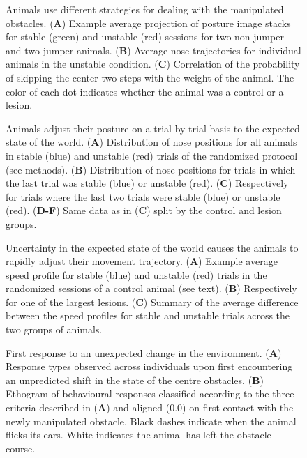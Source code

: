 \begin{figure}
\centering

\caption{Animals use different strategies for dealing with the manipulated obstacles. (\textbf{A}) Example average projection of posture image stacks for stable (green) and unstable (red) sessions for two non-jumper and two jumper animals. (\textbf{B}) Average nose trajectories for individual animals in the unstable condition. (\textbf{C}) Correlation of the probability of skipping the center two steps with the weight of the animal. The color of each dot indicates whether the animal was a control or a lesion.}
\label{fig:jumping}
\end{figure}

\begin{figure}
\centering

\caption{Animals adjust their posture on a trial-by-trial basis to the expected state of the world. (\textbf{A}) Distribution of nose positions for all animals in stable (blue) and unstable (red) trials of the randomized protocol (see methods). (\textbf{B}) Distribution of nose positions for trials in which the last trial was stable (blue) or unstable (red). (\textbf{C}) Respectively for trials where the last two trials were stable (blue) or unstable (red). (\textbf{D-F}) Same data as in (\textbf{C}) split by the control and lesion groups.}
\label{fig:random}
\end{figure}

\begin{figure}
\centering

\caption{Uncertainty in the expected state of the world causes the animals to rapidly adjust their movement trajectory. (\textbf{A}) Example average speed profile for stable (blue) and unstable (red) trials in the randomized sessions of a control animal (see text). (\textbf{B}) Respectively for one of the largest lesions. (\textbf{C}) Summary of the average difference between the speed profiles for stable and unstable trials across the two groups of animals.}
\label{fig:speed}
\end{figure}

\begin{figure}
\centering

\caption{First response to an unexpected change in the environment. (\textbf{A}) Response types observed across individuals upon first encountering an unpredicted shift in the state of the centre obstacles. (\textbf{B}) Ethogram of behavioural responses classified according to the three criteria described in (\textbf{A}) and aligned (0.0) on first contact with the newly manipulated obstacle. Black dashes indicate when the animal flicks its ears. White indicates the animal has left the obstacle course.}
\label{fig:ethogram}
\end{figure}
